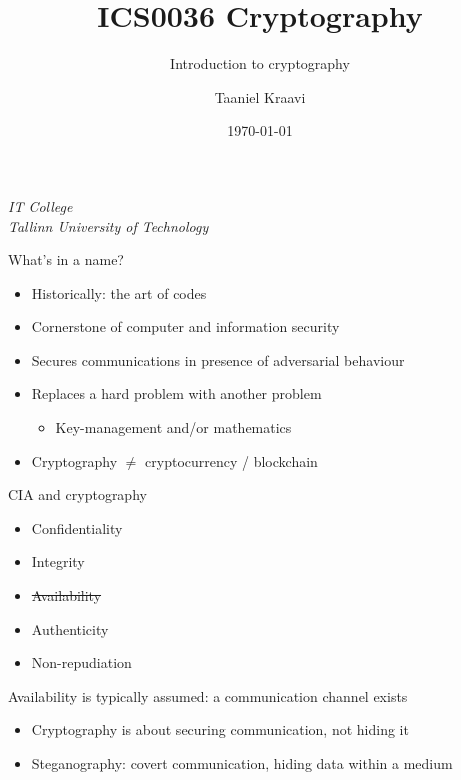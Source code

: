 \usepackage{soul}

\title{ICS0036 Cryptography}
\subtitle{Introduction to cryptography}
\date{\today}
\author{Taaniel Kraavi}
\institute%
{%
  \textit{IT College}\\
  \textit{Tallinn University of Technology}
}


\begin{frame}
  \titlepage
\end{frame}

\begin{frame}{What's in a name?}
  \begin{itemize}[<+(1)->]
    \item Historically: the art of codes
    \item Cornerstone of computer and information security
    \item Secures communications in presence of adversarial behaviour
    \item Replaces a hard problem with another problem
    \par
    \begin{itemize}
      \item Key-management and/or mathematics
    \end{itemize}
    \item Cryptography $\neq$ cryptocurrency / blockchain
  \end{itemize}
\end{frame}

\begin{frame}{CIA and cryptography}
  \pause
  \begin{itemize}
    \item Confidentiality
    \item Integrity
    \item \st{Availability}
    \pause
    \item Authenticity
    \item Non-repudiation
  \end{itemize}

  \vspace{1em}

  \pause
  Availability is typically assumed: a communication channel exists
  \begin{itemize}[<+(1)->]
    \item Cryptography is about securing communication, not hiding it
    \item Steganography: covert communication, hiding data within a medium
  \end{itemize}
\end{frame}


